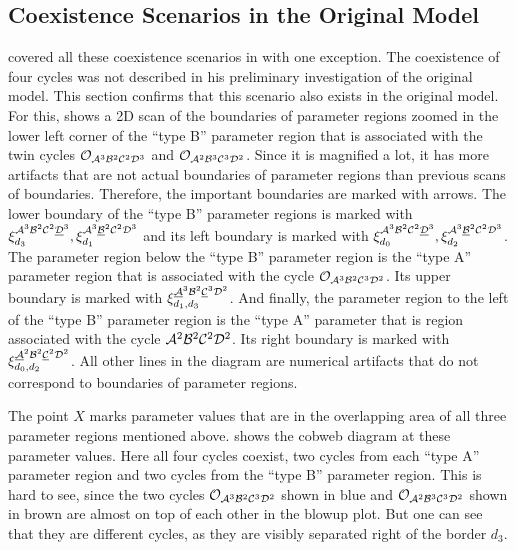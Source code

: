 \subsection{Coexistence Scenarios in the Original Model}

 covered all these coexistence scenarios in \cite{akyuz2022} with one exception.
The coexistence of four cycles was not described in his preliminary investigation of the original model.
This section confirms that this scenario also exists in the original model.
For this,  shows a 2D scan of the boundaries of parameter regions zoomed in the lower left corner of the ``type B'' parameter region that is associated with the twin cycles $\mathcal{O}_{\mathcal{A}^3\mathcal{B}^2\mathcal{C}^2\mathcal{D}^3}$ and $\mathcal{O}_{\mathcal{A}^2\mathcal{B}^3\mathcal{C}^3\mathcal{D}^2}$.
Since it is magnified a lot, it has more artifacts that are not actual boundaries of parameter regions than previous scans of boundaries.
Therefore, the important boundaries are marked with arrows.
The lower boundary of the ``type B'' parameter regions is marked with $\xi^{\mathcal{A}^3\mathcal{B}^2\mathcal{C}^2\underline{\mathcal{D}}^3}_{d_3}, \xi^{\mathcal{A}^3\underline{\mathcal{B}}^2\mathcal{C}^2\mathcal{D}^3}_{d_1}$ and its left boundary is marked with $\xi^{\mathcal{A}^3\mathcal{B}^2\mathcal{C}^2\underline{\mathcal{D}}^3}_{d_0}, \xi^{\mathcal{A}^3\underline{\mathcal{B}}^2\mathcal{C}^2\mathcal{D}^3}_{d_2}$.
The parameter region below the ``type B'' parameter region is the ``type A'' parameter region that is associated with the cycle $\mathcal{O}_{\mathcal{A}^3\mathcal{B}^2\mathcal{C}^3\mathcal{D}^2}$.
Its upper boundary is marked with $\xi^{\underline{\mathcal{A}}^3\mathcal{B}^2\underline{\mathcal{C}}^3\mathcal{D}^2}_{d_1, d_3}$.
And finally, the parameter region to the left of the ``type B'' parameter region is the ``type A'' parameter that is region associated with the cycle $\mathcal{A}^2\mathcal{B}^2\mathcal{C}^2\mathcal{D}^2$.
Its right boundary is marked with $\xi^{\underline{\mathcal{A}}^2\mathcal{B}^2\underline{\mathcal{C}}^2\mathcal{D}^2}_{d_0, d_2}$.
All other lines in the diagram are numerical artifacts that do not correspond to boundaries of parameter regions.

The point $X$ marks parameter values that are in the overlapping area of all three parameter regions mentioned above.
 shows the cobweb diagram at these parameter values.
Here all four cycles coexist, two cycles from each ``type A'' parameter region and two cycles from the ``type B'' parameter region.
This is hard to see, since the two cycles $\mathcal{O}_{\mathcal{A}^3\mathcal{B}^2\mathcal{C}^3\mathcal{D}^2}$ shown in blue and $\mathcal{O}_{\mathcal{A}^2\mathcal{B}^3\mathcal{C}^3\mathcal{D}^2}$ shown in brown are almost on top of each other in the blowup plot.
But one can see that they are different cycles, as they are visibly separated right of the border $d_3$.

